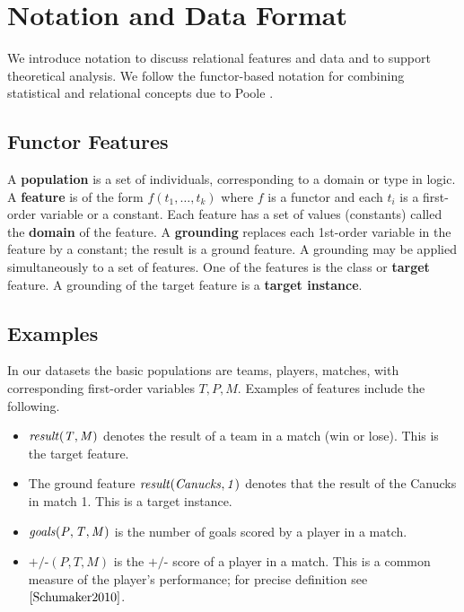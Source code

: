 \documentclass[conference]{IEEEtran}
\newcommand{\team}{T}
\newcommand{\player}{P}
\newcommand{\match}{M}
\newcommand{\plusminus}{\mbox{+/-}}
\begin{document}
\section{Notation and Data Format} We introduce notation to discuss relational features and data and to support theoretical analysis. We follow the functor-based notation for combining statistical and relational concepts due to Poole \cite{Poole2003}.

\subsection{Functor Features}
A \textbf{population} is a set of individuals, corresponding to a domain or type in logic. A \textbf{feature} is of the form $f(t_{1},\ldots,t_{k})$ where $f$ is a functor %
 and each $t_{i}$ is a first-order variable or a constant. Each feature has a set of values (constants) called the \textbf{domain} of the feature.
A \textbf{grounding} replaces each 1st-order variable in the feature by a constant; the result is a ground feature. A grounding may be applied simultaneously to a set of features. One of the features is the class or \textbf{target} feature. A grounding of the target feature is a \textbf{target instance}.

\subsection{Examples} In our datasets the basic populations are teams, players, matches, with corresponding first-order variables $\team, \player, \match$. Examples of features include the following.

\begin{itemize}
\item $\it{result}(\team,\match)$ denotes the result of a team in a match (win or lose). This is the target feature.
\item The ground feature $\it{result}(Canucks,1)$ denotes that the result of the Canucks in match 1. This is a target instance.
\item $\it{goals}(\player,\team,\match)$ is the number of goals scored by a player in a match.
\item $\plusminus(\player,\team,\match)$ is the $\plusminus$ score of a player in a match. This is a common measure of the player's performance; for precise definition see $\cite{Schumaker2010}$.
\end{itemize}
\end{document}

